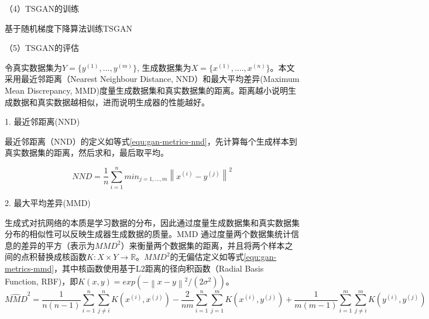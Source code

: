 （4）TSGAN的训练

\begin{algorithm}[H]
 \caption{基于随机梯度下降算法训练TSGAN}
 \renewcommand{\algorithmcfname}{算法}
 \label{gan-tsgan-algorithm}
\end{algorithm}

（5）TSGAN的评估

令真实数据集为$Y = \{y^{(1)}, ..., y^{(m)}\}$, 生成数据集为$X=\{x^{(1)}, ...., x^{(n)}\}$。本文采用最近邻距离（Nearest Neighbour Distance, NND）和最大平均差异(Maximum Mean Discrepancy, MMD)度量生成数据集和真实数据集的距离\cite{esteban2017real}。距离越小说明生成数据和真实数据越相似，进而说明生成器的性能越好。

1. 最近邻距离(NND)

最近邻距离（NND）的定义如等式\ref{equ:gan-metrics-nnd}，先计算每个生成样本到真实数据集的距离，然后求和，最后取平均。

\begin{equation}
\label{equ:gan-metrics-nnd} 
NND = \frac{1}{n}\sum_{i=1}^{n}min_{j=1,...,m}\left \| x^{(i)} - y^{(j)} \right \|^{2}
\end{equation}

2. 最大平均差异(MMD)

生成式对抗网络的本质是学习数据的分布，因此通过度量生成数据集和真实数据集分布的相似性可以反映生成器生成数据的质量。MMD 通过度量两个数据集统计信息的差异的平方（表示为$MMD^{2}$）来衡量两个数据集的距离，并且将两个样本之间的点积替换成核函数$K: X \times Y \rightarrow \mathbb{R}$。$MMD^{2}$的无偏估定义如等式\ref{equ:gan-metrics-mmd}，其中核函数使用基于L2距离的径向积函数（Radial Basis Function, RBF)，即$K(x, y) = exp(-\left \| x-y \right \|^{2} / (2\sigma ^{2}))$。
\begin{equation}
\label{equ:gan-metrics-mmd} 
\hat{MMD}^{2} = \frac{1}{n(n-1)}\sum_{i=1}^{n}\sum_{j\neq i}^{n}K(x^{(i)}, x^{(j)})  - \frac{2}{nm}\sum_{i=1}^{n}\sum_{j=1}^{m}K(x^{(i)}, y^{(j)})+ \frac{1}{m(m-1)}\sum_{i=1}^{m}\sum_{j\neq i}^{m}K(y^{(i)}, y^{(j)}) 
\end{equation}

